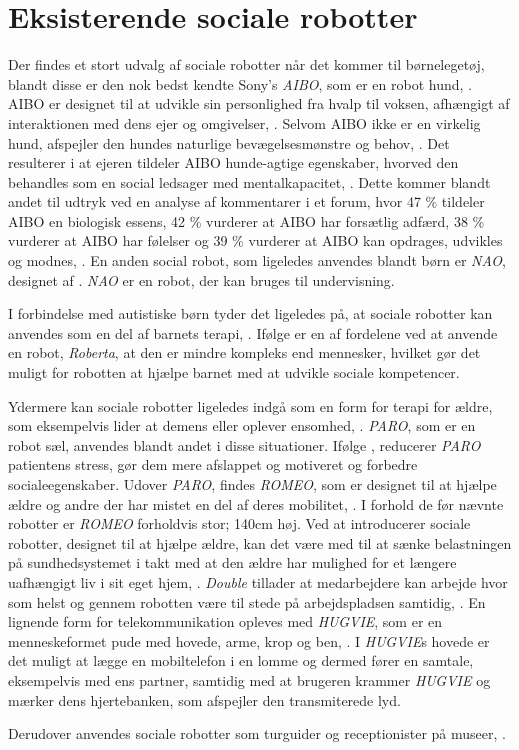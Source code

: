 \section{Eksisterende sociale robotter}
\label{EksisterendeSocialeRobotter}
%
Der findes et stort udvalg af sociale robotter når det kommer til børnelegetøj, blandt disse er den nok bedst kendte Sony's \textit{AIBO}, som er en robot hund, \parencite{WEB:AIBO}. AIBO er designet til at udvikle sin personlighed fra hvalp til voksen, afhængigt af interaktionen med dens ejer og omgivelser, \parencite{WEB:AIBO}. Selvom AIBO ikke er en virkelig hund, afspejler den hundes naturlige bevægelsesmønstre og behov, \parencite[ss. 191-198]{PDF:AnEthologicalEmotional}. Det resulterer i at ejeren tildeler AIBO hunde-agtige egenskaber, hvorved den behandles som en social ledsager med mentalkapacitet, \parencite[s. 2]{PDF:SharingALifeHarvey}. Dette kommer blandt andet til udtryk ved en analyse af kommentarer i et forum, hvor 47 \% tildeler AIBO en biologisk essens, 42 \% vurderer at AIBO har forsætlig adfærd, 38 \% vurderer at AIBO har følelser og 39 \% vurderer at AIBO kan opdrages, udvikles og modnes, \parencite[s. 26]{PDF:InTheCompanyofRobots}. En anden social robot, som ligeledes anvendes blandt børn er \textit{NAO}, designet af \textcite{WEB:NAO}. \textit{NAO} er en robot, der kan bruges til undervisning.  

I forbindelse med autistiske børn tyder det ligeledes på, at sociale robotter kan anvendes som en del af barnets terapi, \parencite[s. 180]{PDF:GamesChrildrenAutism}. Ifølge \textcite[s. 185]{PDF:GamesChrildrenAutism} er en af fordelene ved at anvende en robot, \textit{Roberta}, at den er mindre kompleks end mennesker, hvilket gør det muligt for robotten at hjælpe barnet med at udvikle sociale kompetencer. 

Ydermere kan sociale robotter ligeledes indgå som en form for terapi for ældre, som eksempelvis lider at demens eller oplever ensomhed, \parencite[s. 110]{PDF:TheMobilePhoneAnEmontionalisedSR}. \textit{PARO}, som er en robot sæl, anvendes blandt andet i disse situationer. Ifølge \textcite{WEB:PARO}, reducerer \textit{PARO} patientens stress, gør dem mere afslappet og motiveret og forbedre socialeegenskaber. Udover \textit{PARO}, findes \textit{ROMEO}, som er designet til at hjælpe ældre og andre der har mistet en del af deres mobilitet, \parencite{WEB:ROMEO}. I forhold de før nævnte robotter er \textit{ROMEO} forholdvis stor; 140cm høj. Ved at introducerer sociale robotter, designet til at hjælpe ældre, kan det være med til at sænke belastningen på sundhedsystemet i takt med at den ældre har mulighed for et længere uafhængigt liv i sit eget hjem, \parencite[s. 1]{PDF:SharingALifeHarvey}.\blankline
%
\textit{Double} tillader at medarbejdere kan arbejde hvor som helst og gennem robotten være til stede på arbejdspladsen samtidig, \parencite{WEB:Double}. En lignende form for telekommunikation opleves med \textit{HUGVIE}, som er en menneskeformet pude med hovede, arme, krop og ben, \parencite[s. 78]{PDF:MinimizingTheHuman}. I \textit{HUGVIE}s hovede er det muligt at lægge en mobiltelefon i en lomme og dermed fører en samtale, eksempelvis med ens partner, samtidig med at brugeren krammer \textit{HUGVIE} og mærker dens hjertebanken, som afspejler den transmiterede lyd.

Derudover anvendes sociale robotter som turguider og receptionister på museer, \parencite[s. 22]{PDF:CloseButNotStuck}.
